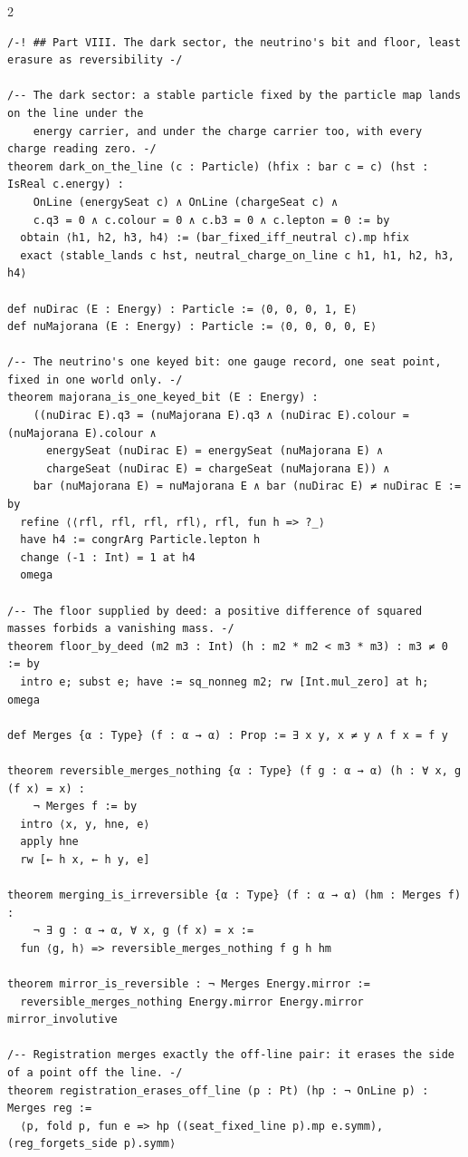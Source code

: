 \documentclass[10pt]{article}
\begin{document}
\begin{multicols}{2}
\begin{Verbatim}[fontsize=\fontsize{6.2}{7.2}\selectfont,breaklines,breakanywhere,breaksymbolleft={}]
/-! ## Part VIII. The dark sector, the neutrino's bit and floor, least erasure as reversibility -/

/-- The dark sector: a stable particle fixed by the particle map lands on the line under the
    energy carrier, and under the charge carrier too, with every charge reading zero. -/
theorem dark_on_the_line (c : Particle) (hfix : bar c = c) (hst : IsReal c.energy) :
    OnLine (energySeat c) ∧ OnLine (chargeSeat c) ∧
    c.q3 = 0 ∧ c.colour = 0 ∧ c.b3 = 0 ∧ c.lepton = 0 := by
  obtain ⟨h1, h2, h3, h4⟩ := (bar_fixed_iff_neutral c).mp hfix
  exact ⟨stable_lands c hst, neutral_charge_on_line c h1, h1, h2, h3, h4⟩

def nuDirac (E : Energy) : Particle := ⟨0, 0, 0, 1, E⟩
def nuMajorana (E : Energy) : Particle := ⟨0, 0, 0, 0, E⟩

/-- The neutrino's one keyed bit: one gauge record, one seat point, fixed in one world only. -/
theorem majorana_is_one_keyed_bit (E : Energy) :
    ((nuDirac E).q3 = (nuMajorana E).q3 ∧ (nuDirac E).colour = (nuMajorana E).colour ∧
      energySeat (nuDirac E) = energySeat (nuMajorana E) ∧
      chargeSeat (nuDirac E) = chargeSeat (nuMajorana E)) ∧
    bar (nuMajorana E) = nuMajorana E ∧ bar (nuDirac E) ≠ nuDirac E := by
  refine ⟨⟨rfl, rfl, rfl, rfl⟩, rfl, fun h => ?_⟩
  have h4 := congrArg Particle.lepton h
  change (-1 : Int) = 1 at h4
  omega

/-- The floor supplied by deed: a positive difference of squared masses forbids a vanishing mass. -/
theorem floor_by_deed (m2 m3 : Int) (h : m2 * m2 < m3 * m3) : m3 ≠ 0 := by
  intro e; subst e; have := sq_nonneg m2; rw [Int.mul_zero] at h; omega

def Merges {α : Type} (f : α → α) : Prop := ∃ x y, x ≠ y ∧ f x = f y

theorem reversible_merges_nothing {α : Type} (f g : α → α) (h : ∀ x, g (f x) = x) :
    ¬ Merges f := by
  intro ⟨x, y, hne, e⟩
  apply hne
  rw [← h x, ← h y, e]

theorem merging_is_irreversible {α : Type} (f : α → α) (hm : Merges f) :
    ¬ ∃ g : α → α, ∀ x, g (f x) = x :=
  fun ⟨g, h⟩ => reversible_merges_nothing f g h hm

theorem mirror_is_reversible : ¬ Merges Energy.mirror :=
  reversible_merges_nothing Energy.mirror Energy.mirror mirror_involutive

/-- Registration merges exactly the off-line pair: it erases the side of a point off the line. -/
theorem registration_erases_off_line (p : Pt) (hp : ¬ OnLine p) : Merges reg :=
  ⟨p, fold p, fun e => hp ((seat_fixed_line p).mp e.symm), (reg_forgets_side p).symm⟩


\end{Verbatim}
\end{multicols}
\end{document}
